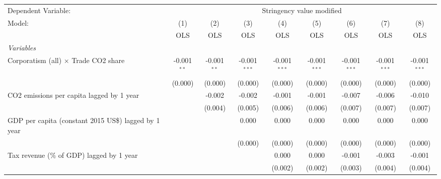 
\begingroup
\centering
\begin{tabular}{lcccccccc}
   \toprule
   Dependent Variable: & \multicolumn{8}{c}{Stringency value modified}\\
   Model:                                                    & (1)           & (2)           & (3)            & (4)            & (5)            & (6)            & (7)            & (8)\\  
                                                             &  OLS          & OLS           & OLS            & OLS            & OLS            & OLS            & OLS            & OLS\\  
   \midrule
   \emph{Variables}\\
   Corporatism (all) $\times$ Trade CO2 share                & -0.001$^{**}$ & -0.001$^{**}$ & -0.001$^{***}$ & -0.001$^{***}$ & -0.001$^{***}$ & -0.001$^{***}$ & -0.001$^{***}$ & -0.001$^{***}$\\   
                                                             & (0.000)       & (0.000)       & (0.000)        & (0.000)        & (0.000)        & (0.000)        & (0.000)        & (0.000)\\   
   CO2 emissions per capita lagged by 1 year                 &               & -0.002        & -0.002         & -0.001         & -0.001         & -0.007         & -0.006         & -0.010\\   
                                                             &               & (0.004)       & (0.005)        & (0.006)        & (0.006)        & (0.007)        & (0.007)        & (0.007)\\   
   GDP per capita (constant 2015 US\$) lagged by 1 year      &               &               & 0.000          & 0.000          & 0.000          & 0.000          & 0.000          & 0.000\\   
                                                             &               &               & (0.000)        & (0.000)        & (0.000)        & (0.000)        & (0.000)        & (0.000)\\   
   Tax revenue (\% of GDP) lagged by 1 year                  &               &               &                & 0.000          & 0.000          & -0.001         & -0.003         & -0.001\\   
                                                             &               &               &                & (0.002)        & (0.002)        & (0.003)        & (0.004)        & (0.004)\\   

\end{tabular}
